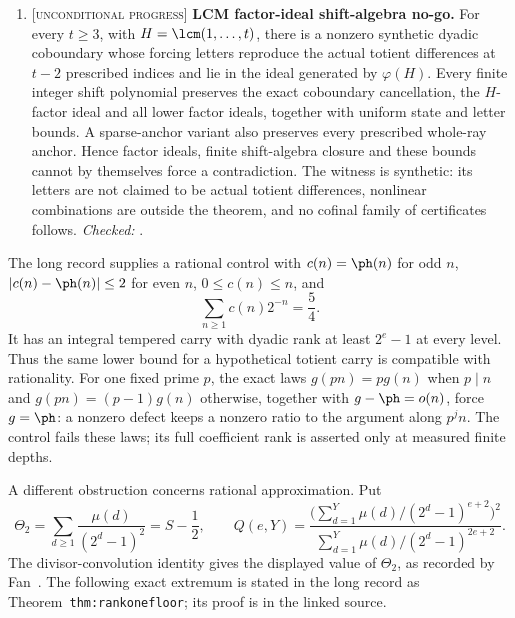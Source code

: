 \documentclass[11pt]{article}
\newcommand{\stag}[1]{{\normalfont\footnotesize\textsc{[#1]}}}
\begin{document}
\begin{enumerate}
\item\label{res:factorideal} \stag{unconditional progress}
\textbf{LCM factor-ideal shift-algebra no-go.}  For every $t\ge3$, with
$H=\lcm(1,\ldots,t)$, there is a nonzero synthetic dyadic coboundary whose
forcing letters reproduce the actual totient differences at $t-2$ prescribed
indices and lie in the ideal generated by $\varphi(H)$.  Every finite integer
shift polynomial preserves the exact coboundary cancellation, the $H$-factor
ideal and all lower factor ideals, together with uniform state and letter
bounds.  A sparse-anchor variant also preserves every prescribed whole-ray
anchor.  Hence factor ideals, finite shift-algebra closure and these bounds
cannot by themselves force a contradiction.  The witness is synthetic: its
letters are not claimed to be actual totient differences, nonlinear
combinations are outside the theorem, and no cofinal family of certificates
follows.
{\footnotesize\emph{Checked:}
.}
\end{enumerate}

The long record supplies a rational control with
$c(n)=\ph(n)$ for odd $n$, $|c(n)-\ph(n)|\le2$ for even $n$, $0\le c(n)\le n$,
and
\[
 \sum_{n\ge1}c(n)2^{-n}=\frac54.
\]
It has an integral tempered carry with dyadic rank at least $2^e-1$ at every
level. Thus the same lower bound for a hypothetical totient carry is
compatible with rationality. For one fixed prime $p$, the exact laws
$g(pn)=p g(n)$ when $p\mid n$ and $g(pn)=(p-1)g(n)$ otherwise, together
with $g-\ph=o(n)$, force $g=\ph$: a nonzero defect keeps a nonzero ratio
to the argument along $p^j n$. The control fails these laws; its full
coefficient rank is asserted only at measured finite depths.

A different obstruction concerns rational approximation. Put
\[
 \Theta_2=\sum_{d\ge1}\frac{\mu(d)}{(2^d-1)^2}=S-\frac12,
 \qquad
 Q(e,Y)=\frac{\bigl(\sum_{d=1}^{Y}\mu(d)/(2^d-1)^{e+2}\bigr)^2}
 {\sum_{d=1}^{Y}\mu(d)/(2^d-1)^{2e+2}}.
\]
The divisor-convolution identity gives the displayed value of $\Theta_2$,
as recorded by Fan~\cite{fan2026totient}. The following exact extremum is
stated in the long record as Theorem~\texttt{thm:rankonefloor}; its proof is
in the linked source.
\end{document}

